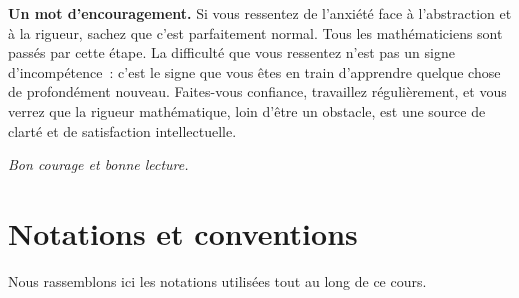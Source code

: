 \documentclass[12pt,a4paper,openany]{book}
\theoremstyle{definition}
\begin{document}
\medskip

\textbf{Un mot d'encouragement.} Si vous ressentez de l'anxiété face à l'abstraction et à la rigueur, sachez que c'est parfaitement normal. Tous les mathématiciens sont passés par cette étape. La difficulté que vous ressentez n'est pas un signe d'incompétence~: c'est le signe que vous êtes en train d'apprendre quelque chose de profondément nouveau. Faites-vous confiance, travaillez régulièrement, et vous verrez que la rigueur mathématique, loin d'être un obstacle, est une source de clarté et de satisfaction intellectuelle.

\vfill
\hfill\textit{Bon courage et bonne lecture.}


\chapter*{Notations et conventions}

Nous rassemblons ici les notations utilisées tout au long de ce cours.

\bigskip
\end{document}
